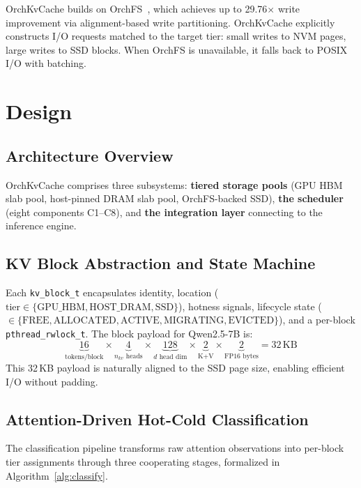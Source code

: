 \documentclass[conference]{IEEEtran}
\begin{document}
OrchKvCache builds on OrchFS~\cite{orchfs}, which achieves up to 29.76$\times$ write improvement via alignment-based write partitioning. OrchKvCache explicitly constructs I/O requests matched to the target tier: small writes to NVM pages, large writes to SSD blocks. When OrchFS is unavailable, it falls back to POSIX I/O with batching.


\section{Design}

\subsection{Architecture Overview}


OrchKvCache comprises three subsystems: \textbf{tiered storage pools} (GPU HBM slab pool, host-pinned DRAM slab pool, OrchFS-backed SSD), \textbf{the scheduler} (eight components C1--C8), and \textbf{the integration layer} connecting to the inference engine.

\subsection{KV Block Abstraction and State Machine}

Each \texttt{kv\_block\_t} encapsulates identity, location ($\text{tier} \in \{\text{GPU\_HBM}, \text{HOST\_DRAM}, \text{SSD}\}$), hotness signals, lifecycle state ($\in \{\text{FREE}, \text{ALLOCATED}, \text{ACTIVE}, \text{MIGRATING}, \text{EVICTED}\}$), and a per-block \texttt{pthread\_rwlock\_t}. The block payload for Qwen2.5-7B is:
\[
\underbrace{16}_{\text{tokens/block}} \times \underbrace{4}_{n_{kv}\text{ heads}} \times \underbrace{128}_{d\text{ head dim}} \times \underbrace{2}_{\text{K+V}} \times \underbrace{2}_{\text{FP16 bytes}} = 32\,\text{KB}
\]
This 32\,KB payload is naturally aligned to the SSD page size, enabling efficient I/O without padding.


\subsection{Attention-Driven Hot-Cold Classification}
\label{sec:classification}

The classification pipeline transforms raw attention observations into per-block tier assignments through three cooperating stages, formalized in Algorithm~\ref{alg:classify}.
\end{document}
